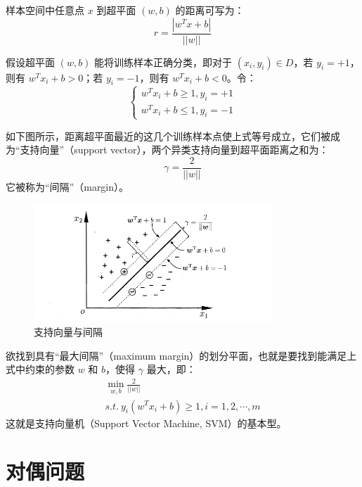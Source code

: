 \documentclass[12pt, a4paper]{article} %
\begin{document}
样本空间中任意点 $x$ 到超平面 $(w, b)$ 的距离可写为：
\begin{equation*}
    r = \frac{|w^T x + b|}{||w||}
\end{equation*}

假设超平面 $(w, b)$ 能将训练样本正确分类，即对于 $(x_i, y_i) \in D$，若 $y_i = +1$，则有 $w^T x_i + b > 0$；若 $y_i = -1$，则有 $w^T x_i + b < 0$。令：
\begin{equation*}
    \left\{\begin{matrix}
        w^T x_i + b \ge 1, y_i = +1 \\
        w^T x_i + b \le 1, y_i = -1
    \end{matrix}\right.
\end{equation*}

如下图所示，距离超平面最近的这几个训练样本点使上式等号成立，它们被成为“支持向量”（support vector），两个异类支持向量到超平面距离之和为：
\begin{equation*}
    \gamma = \frac{2}{||w||}
\end{equation*}
它被称为“间隔”（margin）。

\begin{figure}[H]
    \centering
    \includegraphics[width=0.8\textwidth]{../img/6-2-支持向量与间隔.png}
    \caption{支持向量与间隔}
    \label{fig:支持向量与间隔}
\end{figure}

欲找到具有“最大间隔”（maximum margin）的划分平面，也就是要找到能满足上式中约束的参数 $w$ 和 $b$，使得 $\gamma$ 最大，即：
\begin{equation*}
    \begin{array}{*{20}{l}}
        \displaystyle \min_{w, b} \frac{2}{||w||}\\
        \displaystyle s.t. \ y_i(w^T x_i + b) \ge 1, i = 1, 2, \cdots, m
    \end{array}
\end{equation*}
这就是支持向量机（Support Vector Machine, SVM）的基本型。

\section{对偶问题}
\end{document}
